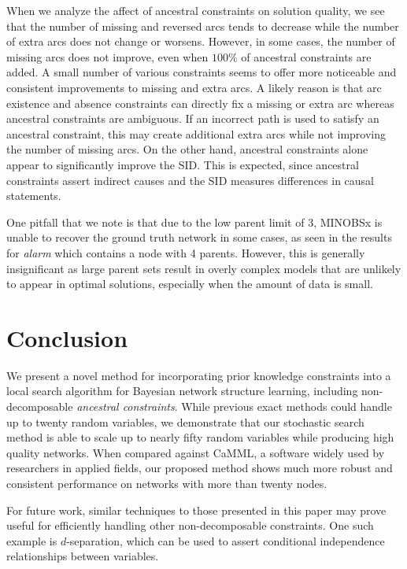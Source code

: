 \documentclass[twoside,11pt]{article}
\begin{document}
\smallskip
When we analyze the affect of ancestral constraints on solution quality, we see that the number of missing and reversed arcs tends to decrease while the number of extra arcs
does not change or worsens. However, in some cases, the number of missing arcs does not improve, even when $100\%$ of ancestral constraints are added.
A small number of various constraints seems to offer more noticeable and consistent improvements to missing and extra arcs. 
 A likely reason is that arc existence and absence constraints can directly fix a missing or extra arc whereas ancestral constraints are 
ambiguous. If an incorrect path is used to satisfy an ancestral constraint, this may create additional extra arcs while not improving the number of missing arcs. 
On the other hand, ancestral constraints alone appear to significantly improve the SID. This is expected, since ancestral constraints assert
indirect causes and the SID measures differences in causal statements.

\smallskip
One pitfall that we note is that due to the low parent limit of 3, MINOBSx is unable to recover the ground truth network in some cases, as seen in the results for \emph{alarm} which
contains a node with 4 parents. However, this is generally insignificant as large parent sets result in overly complex models that are unlikely to appear in optimal
solutions, especially when the amount of data is small. 


\section{Conclusion}

We present a novel method for incorporating prior knowledge constraints into a local search algorithm for Bayesian network structure learning, including non-decomposable \emph{ancestral constraints}. While previous exact methods could handle up to twenty random variables, we demonstrate that our stochastic search method
is able to scale up to nearly fifty random variables while producing high quality networks. When compared against CaMML, a software widely used by researchers in applied
fields, our proposed method shows much more robust and consistent performance on networks with more than twenty nodes. 

\smallskip
For future work,
similar techniques to those presented in this paper may prove useful for efficiently handling other non-decomposable constraints. One such example 
is $d$-separation, which can be used to assert conditional independence relationships between variables.
\end{document}
